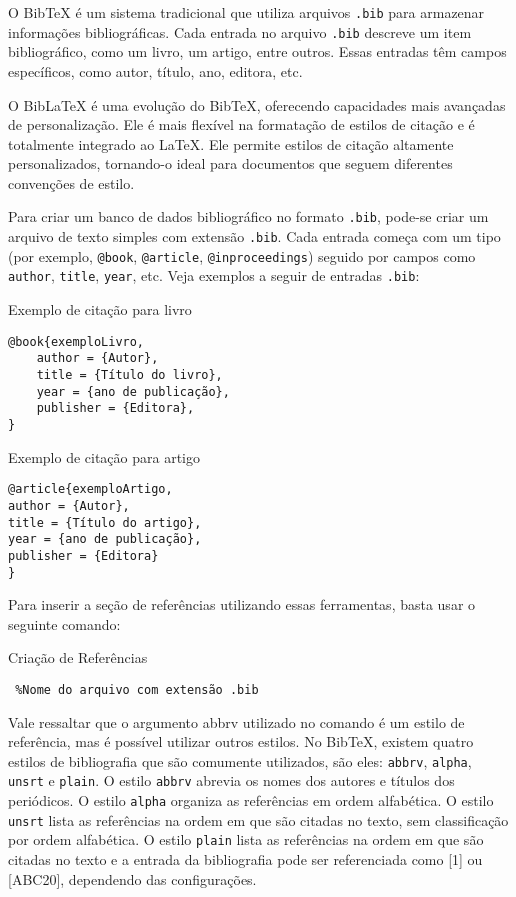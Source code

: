 \noindent O BibTeX é um sistema tradicional que utiliza arquivos \verb|.bib| para armazenar informações bibliográficas. Cada entrada no arquivo \verb|.bib| descreve um item bibliográfico, como um livro, um artigo, entre outros. Essas entradas têm campos específicos, como autor, título, ano, editora, etc.

\noindent O BibLaTeX é uma evolução do BibTeX, oferecendo capacidades mais avançadas de personalização. Ele é mais flexível na formatação de estilos de citação e é totalmente integrado ao \LaTeX{}. Ele permite estilos de citação altamente personalizados, tornando-o ideal para documentos que seguem diferentes convenções de estilo.

\noindent Para criar um banco de dados bibliográfico no formato \verb|.bib|, pode-se criar um arquivo de texto simples com extensão \verb|.bib|. Cada entrada começa com um tipo (por exemplo, \verb|@book|, \verb|@article|, \verb|@inproceedings|) seguido por campos como \verb|author|, \verb|title|, \verb|year|, etc. Veja exemplos a seguir de entradas \verb|.bib|:

\begin{trailer}{Exemplo de citação para livro}
\begin{verbatim} 
@book{exemploLivro,
    author = {Autor},
    title = {Título do livro},
    year = {ano de publicação},
    publisher = {Editora},
} \end{verbatim}
\end{trailer}

\begin{trailer}{Exemplo de citação para artigo}
\begin{verbatim} 
@article{exemploArtigo,
author = {Autor},
title = {Título do artigo},
year = {ano de publicação},
publisher = {Editora}
} \end{verbatim}
\end{trailer}

\noindent Para inserir a seção de referências utilizando essas ferramentas, basta usar o seguinte comando: 

\begin{trailer}{Criação de Referências}
\begin{verbatim} 
 %Nome do arquivo com extensão .bib

\end{verbatim}
\end{trailer}

\noindent Vale ressaltar que o argumento abbrv utilizado no comando \verb|| é um estilo de referência, mas é possível utilizar outros estilos. No BibTeX, existem quatro estilos de bibliografia que são comumente utilizados, são eles: \verb|abbrv|, \verb|alpha|, \verb|unsrt| e \verb|plain|. O estilo \verb|abbrv| abrevia os nomes dos autores e títulos dos periódicos. O estilo \verb|alpha| organiza as referências em ordem alfabética. O estilo \verb|unsrt| lista as referências na ordem em que são citadas no texto, sem classificação por ordem alfabética. O estilo \verb|plain| lista as referências na ordem em que são citadas no texto e a entrada da bibliografia pode ser referenciada como [1] ou [ABC20], dependendo das configurações.

